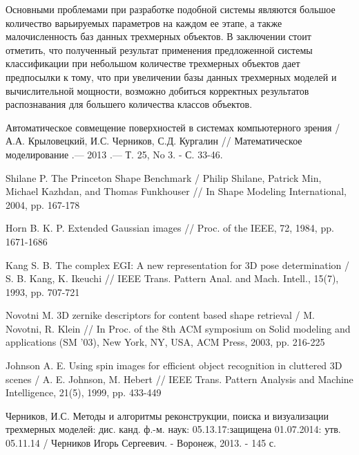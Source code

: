 \documentclass[14pt]{article}
\numberwithin{figure}{section}
\numberwithin{equation}{section}
\begin{document}
Основными проблемами при разработке подобной системы являются большое количество варьируемых параметров на каждом ее этапе, а также малочисленность баз данных трехмерных объектов. В заключении стоит отметить, что полученный результат применения предложенной системы классификации при небольшом количестве трехмерных объектов дает предпосылки к тому, что при увеличении базы данных трехмерных моделей и вычислительной мощности, возможно добиться корректных результатов распознавания для большего количества классов объектов.

\newpage
{}
\begin{thebibliography}{9}

    Автоматическое совмещение поверхностей в системах компьютерного зрения / А.А. Крыловецкий, И.С. Черников, С.Д. Кургалин // Математическое моделирование .— 2013 .— Т. 25, No 3. - С. 33-46.

    Shilane P. The Princeton Shape Benchmark / Philip Shilane, Patrick Min, Michael Kazhdan, and Thomas Funkhouser // In Shape Modeling International, 2004, pp. 167-178

	Horn B. K. P. Extended Gaussian images // Proc. of the IEEE, 72, 1984, pp. 1671-1686

	Kang S. B. The complex EGI: A new representation for 3D pose determination / S. B. Kang, K. Ikeuchi // IEEE Trans. Pattern Anal. and Mach. Intell., 15(7), 1993, pp. 707-721

	Novotni M. 3D zernike descriptors for content based shape retrieval / M. Novotni, R. Klein // In Proc. of the 8th ACM symposium on Solid modeling and applications (SM ’03), New York, NY, USA, ACM Press, 2003, pp. 216-225

    Johnson A. E. Using spin images for efficient object recognition in cluttered 3D scenes / A. E. Johnson, M. Hebert // IEEE Trans. Pattern Analysis and Machine Intelligence, 21(5), 1999, pp. 433-449

    Черников, И.С. Методы и алгоритмы реконструкции, поиска и визуализации трехмерных моделей: дис. канд. ф.-м. наук: 05.13.17:защищена 01.07.2014: утв. 05.11.14 / Черников Игорь Сергеевич. - Воронеж, 2013. - 145 с.



\end{thebibliography}
\end{document}
